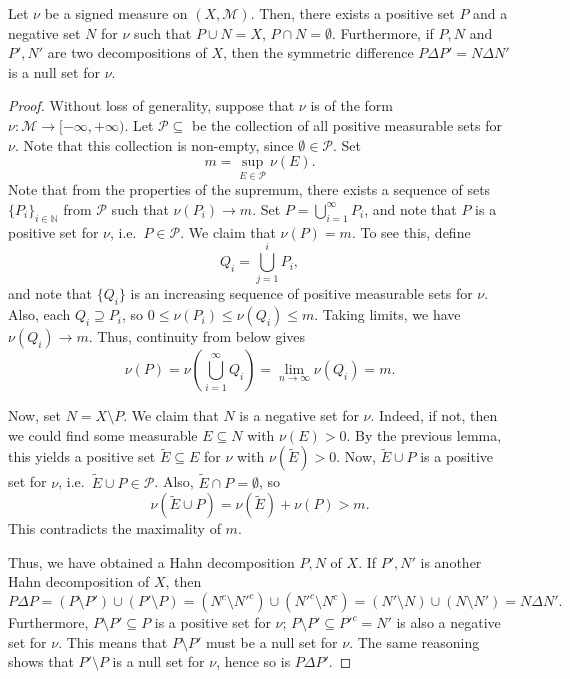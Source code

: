\documentclass[11pt]{article}
\newcommand{\N}{\mathbb{N}}
\newcommand{\M}{\mathcal{M}}
\theoremstyle{definition}
\theoremstyle{remark}
\begin{document}
    \begin{theorem}
        Let $\nu$ be a signed measure on $(X, \M)$. Then, there exists a positive set
        $P$ and a negative set $N$ for $\nu$ such that $P \cup N = X$, $P \cap N =
        \emptyset$. Furthermore, if $P, N$ and $P', N'$ are two decompositions of
        $X$, then the symmetric difference $P\Delta P' = N\Delta N'$ is a null set
        for $\nu$.
    \end{theorem}
    \begin{proof}
        Without loss of generality, suppose that $\nu$ is of the form $\nu\colon \M
        \to [-\infty, +\infty)$. Let $\mathscr{P} \subseteq$ be the collection of all
        positive measurable sets for $\nu$. Note that this collection is non-empty,
        since $\emptyset \in \mathscr{P}$. Set \[
            m = \sup_{E \in \mathscr{P}} \nu(E).
        \] Note that from the properties of the supremum, there exists a sequence of
        sets $\{P_i\}_{i \in \N}$ from $\mathscr{P}$ such that $\nu(P_i) \to m$. Set
        $P = \bigcup_{i = 1}^\infty P_i$, and note that $P$ is a positive set for
        $\nu$, i.e.\ $P \in \mathscr{P}$. We claim that $\nu(P) = m$. To see this,
        define \[
            Q_i = \bigcup_{j = 1}^i P_i,
        \] and note that $\{Q_i\}$ is an increasing sequence of positive measurable
        sets for $\nu$. Also, each $Q_i \supseteq P_i$, so $0 \leq \nu(P_i) \leq
        \nu(Q_i) \leq m$. Taking limits, we have $\nu(Q_i) \to m$. Thus, continuity
        from below gives \[
            \nu(P) = \nu\left(\bigcup_{i = 1}^\infty Q_i\right) = \lim_{n \to \infty}
            \nu(Q_i) = m.
        \]

        Now, set $N = X\setminus P$. We claim that $N$ is a negative set for $\nu$.
        Indeed, if not, then we could find some measurable $E \subseteq N$ with
        $\nu(E) > 0$. By the previous lemma, this yields a positive set $\tilde{E}
        \subseteq E$ for $\nu$ with $\nu(\tilde{E}) > 0$. Now, $\tilde{E} \cup P$ is
        a positive set for $\nu$, i.e.\ $\tilde{E} \cup P \in \mathscr{P}$. Also,
        $\tilde{E} \cap P = \emptyset$, so \[
            \nu(\tilde{E} \cup P) = \nu(\tilde{E}) + \nu(P) > m.
        \] This contradicts the maximality of $m$.

        Thus, we have obtained a Hahn decomposition $P, N$ of $X$. If $P', N'$ is
        another Hahn decomposition of $X$, then \[
            P\Delta P = (P\setminus P') \cup (P'\setminus P) = (N^c\setminus N'^c)
            \cup (N'^c\setminus N^c) = (N'\setminus N) \cup (N\setminus N') = N\Delta
            N'.
        \] Furthermore, $P\setminus P' \subseteq P$ is a positive set for $\nu$;
        $P\setminus P' \subseteq P'^c = N'$ is also a negative set for $\nu$. This
        means that $P\setminus P'$ must be a null set for $\nu$. The same reasoning
        shows that $P'\setminus P$ is a null set for $\nu$, hence so is $P\Delta P'$.
    \end{proof}
\end{document}

